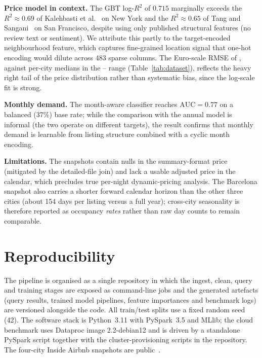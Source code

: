 \documentclass[conference]{IEEEtran}
\begin{document}
\textbf{Price model in context.} The GBT log-$R^2$ of $0.715$ marginally exceeds the $R^2 \approx 0.69$ of Kalehbasti et al.~\cite{kalehbasti2019airbnb} on New York and the $R^2 \approx 0.65$ of Tang and Sangani~\cite{tang2015neighborhood} on San Francisco, despite using only published structural features (no review text or sentiment). We attribute this partly to the target-encoded neighbourhood feature, which captures fine-grained location signal that one-hot encoding would dilute across 483 sparse columns. The Euro-scale RMSE of , against per-city medians in the -- range (Table~\ref{tab:dataset}), reflects the heavy right tail of the price distribution rather than systematic bias, since the log-scale fit is strong.

\textbf{Monthly demand.} The month-aware classifier reaches $\text{AUC}=0.77$ on a balanced (37\%) base rate; while the comparison with the annual model is informal (the two operate on different targets), the result confirms that monthly demand is learnable from listing structure combined with a cyclic month encoding.

\textbf{Limitations.} The snapshots contain nulls in the summary-format price (mitigated by the detailed-file join) and lack a usable adjusted price in the calendar, which precludes true per-night dynamic-pricing analysis. The Barcelona snapshot also carries a shorter forward calendar horizon than the other three cities (about 154 days per listing versus a full year); cross-city seasonality is therefore reported as occupancy \emph{rates} rather than raw day counts to remain comparable.

\section{Reproducibility}

The pipeline is organised as a single repository in which the ingest, clean, query and training stages are exposed as command-line jobs and the generated artefacts (query results, trained model pipelines, feature importances and benchmark logs) are versioned alongside the code. All train/test splits use a fixed random seed (42). The software stack is Python~3.11 with PySpark~3.5 and MLlib; the cloud benchmark uses Dataproc image 2.2-debian12 and is driven by a standalone PySpark script together with the cluster-provisioning scripts in the repository. The four-city Inside Airbnb snapshots are public~\cite{insideairbnb2024}.
\end{document}
